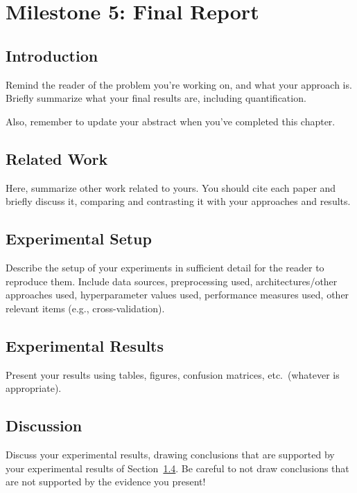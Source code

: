 \documentclass{report}
\begin{document}
\chapter{Milestone 5: Final Report}


\section{Introduction}
\label{sec:M5-intro}

Remind the reader of the problem you're working on, and what your approach is.  Briefly summarize what your final results are, including quantification.

Also, remember to update your abstract when you've completed this chapter.

\section{Related Work}

Here, summarize other work related to yours.  You should cite each paper and briefly discuss it, comparing and contrasting it with your approaches and results. 


\section{Experimental Setup}
\label{sec:M3-setup}

Describe the setup of your experiments  in sufficient detail for the reader to reproduce them.  Include data sources, preprocessing used, architectures/other approaches used, hyperparameter values used, performance measures used, other relevant items (e.g., cross-validation).

\section{Experimental Results}
\label{sec:M5-results}

Present your results  using tables, figures, confusion matrices, etc.\ (whatever is appropriate). 

\section{Discussion}

Discuss your experimental results, drawing conclusions that are supported by your experimental results of Section~\ref{sec:M5-results}.   Be careful to not draw conclusions that are not supported by the evidence you present!
\end{document}
